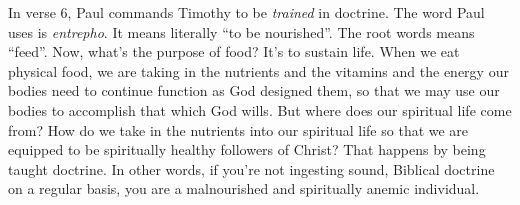 \documentclass[letterpaper, 12pt]{article}
\begin{document}
    In verse 6, Paul commands Timothy to be \emph{trained} in doctrine.
    The word Paul uses is \emph{entrepho}. It means literally ``to be
    nourished''. The root words means ``feed''. Now, what's the purpose
    of food? It's to sustain life. When we eat physical food, we are
    taking in the nutrients and the vitamins and the energy our bodies
    need to continue function as God designed them, so that we may use
    our bodies to accomplish that which God wills. But where does our
    spiritual life come from? How do we take in the nutrients into our
    spiritual life so that we are equipped to be spiritually healthy
    followers of Christ? That happens by being taught doctrine. In other
    words, if you're not ingesting sound, Biblical doctrine on a regular
    basis, you are a malnourished and spiritually anemic individual.
\end{document}
